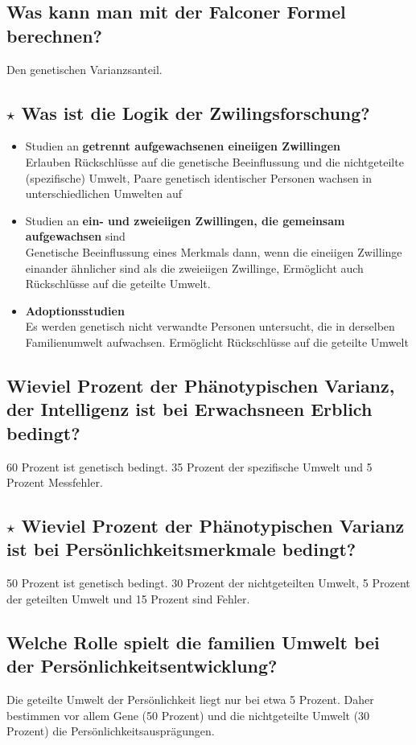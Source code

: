\documentclass[a4paper,9pt,DIV=14]{scrartcl}
\begin{document}
\subsection{Was kann man mit der Falconer Formel berechnen?}
Den genetischen Varianzsanteil.
\subsection{$\star$ Was ist die Logik der Zwilingsforschung?} %
\begin{itemize}
\item Studien an \textbf{getrennt aufgewachsenen eineiigen Zwillingen}\\
Erlauben Rückschlüsse auf die genetische Beeinflussung und die nichtgeteilte
(spezifische) Umwelt, Paare genetisch identischer Personen wachsen in unterschiedlichen Umwelten auf

\item Studien an \textbf{ein- und zweieiigen Zwillingen, die gemeinsam aufgewachsen} sind\\
Genetische Beeinflussung eines Merkmals dann, wenn die eineiigen Zwillinge einander ähnlicher sind als die zweieiigen Zwillinge, Ermöglicht auch Rückschlüsse auf die geteilte Umwelt.

\item \textbf{Adoptionsstudien}\\
Es werden genetisch nicht verwandte Personen untersucht, die in derselben
Familienumwelt aufwachsen. Ermöglicht Rückschlüsse auf die geteilte Umwelt
\end{itemize}
\subsection{Wieviel Prozent der Phänotypischen Varianz, der Intelligenz ist bei Erwachsneen Erblich bedingt?}
60 Prozent ist genetisch bedingt. 35 Prozent der spezifische Umwelt und 5 Prozent Messfehler.
\subsection{$\star$ Wieviel Prozent der Phänotypischen Varianz ist bei Persönlichkeitsmerkmale bedingt?} %
50 Prozent ist genetisch bedingt. 30 Prozent der nichtgeteilten Umwelt, 5 Prozent der geteilten Umwelt und 15 Prozent sind Fehler.
\subsection{Welche Rolle spielt die familien Umwelt bei der Persönlichkeitsentwicklung?}
Die geteilte Umwelt der Persönlichkeit liegt nur bei etwa 5 Prozent. Daher bestimmen vor allem Gene (50 Prozent) und die nichtgeteilte Umwelt (30 Prozent) die Persönlichkeitsausprägungen.
    
\end{document}

